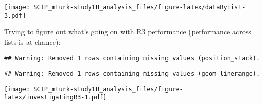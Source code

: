 \documentclass[]{article}
\newenvironment{Shaded}{\begin{snugshade}}{\end{snugshade}}
\newcommand{\KeywordTok}[1]{\textcolor[rgb]{0.13,0.29,0.53}{\textbf{#1}}}
\newcommand{\DataTypeTok}[1]{\textcolor[rgb]{0.13,0.29,0.53}{#1}}
\newcommand{\DecValTok}[1]{\textcolor[rgb]{0.00,0.00,0.81}{#1}}
\newcommand{\StringTok}[1]{\textcolor[rgb]{0.31,0.60,0.02}{#1}}
\newcommand{\OtherTok}[1]{\textcolor[rgb]{0.56,0.35,0.01}{#1}}
\newcommand{\OperatorTok}[1]{\textcolor[rgb]{0.81,0.36,0.00}{\textbf{#1}}}
\newcommand{\NormalTok}[1]{#1}
\begin{document}
\texttt{[image: SCIP\_mturk-study1B\_analysis\_files/figure-latex/dataByList-3.pdf]}

Trying to figure out what's going on with R3 performance (performance
across lists is at chance):

\begin{Shaded}
\end{Shaded}

\begin{verbatim}
## Warning: Removed 1 rows containing missing values (position_stack).
\end{verbatim}

\begin{verbatim}
## Warning: Removed 1 rows containing missing values (geom_linerange).
\end{verbatim}

\texttt{[image: SCIP\_mturk-study1B\_analysis\_files/figure-latex/investigatingR3-1.pdf]}
\end{document}
